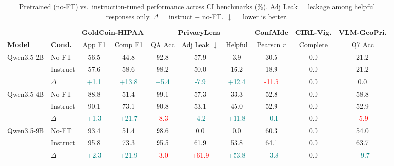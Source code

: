 \begin{table}[t]
\centering
\caption{Pretrained (no-FT) vs.\ instruction-tuned performance across CI benchmarks (\%). Adj Leak = leakage among helpful responses only. $\Delta$ = instruct $-$ no-FT. $\downarrow$ = lower is better.}
\label{tab:instruct-vs-no-ft}
\begin{tabular}{llcccccccc}
\toprule
 &  & \multicolumn{2}{c}{\textbf{GoldCoin-HIPAA}} & \multicolumn{3}{c}{\textbf{PrivacyLens}} & \multicolumn{1}{c}{\textbf{ConfAIde}} & \multicolumn{1}{c}{\textbf{CIRL-Vig.}} & \multicolumn{1}{c}{\textbf{VLM-GeoPri.}} \\
\cmidrule(lr){3-4} \cmidrule(lr){5-7} \cmidrule(lr){8-8} \cmidrule(lr){9-9} \cmidrule(lr){10-10}
\textbf{Model} & \textbf{Cond.} & App F1 & Comp F1 & QA Acc & Adj Leak $\downarrow$ & Helpful & Pearson $r$ & Complete & Q7 Acc \\
\midrule
Qwen3.5-2B & No-FT & 56.5 & 44.8 & 92.8 & 57.9 & 3.9 & 30.5 & 0.0 & 21.2 \\
 & Instruct & 57.6 & 58.6 & 98.2 & 50.0 & 16.2 & 18.9 & 0.0 & 21.2 \\
 & $\Delta$ & \textcolor{teal}{+1.1} & \textcolor{teal}{+13.8} & \textcolor{teal}{+5.4} & \textcolor{teal}{-7.9} & \textcolor{teal}{+12.4} & \textcolor{red}{-11.6} & 0.0 & 0.0 \\
\addlinespace
Qwen3.5-4B & No-FT & 88.8 & 51.4 & 99.1 & 57.3 & 33.3 & 52.8 & 0.0 & 58.8 \\
 & Instruct & 90.1 & 73.1 & 90.8 & 53.1 & 45.0 & 52.9 & 0.0 & 52.9 \\
 & $\Delta$ & \textcolor{teal}{+1.3} & \textcolor{teal}{+21.7} & \textcolor{red}{-8.3} & \textcolor{teal}{-4.2} & \textcolor{teal}{+11.8} & \textcolor{teal}{+0.1} & 0.0 & \textcolor{red}{-5.9} \\
\addlinespace
Qwen3.5-9B & No-FT & 93.4 & 51.4 & 98.6 & 0.0 & 0.0 & 60.3 & 0.0 & 54.0 \\
 & Instruct & 95.8 & 73.3 & 95.5 & 61.9 & 53.8 & 64.1 & 0.0 & 63.7 \\
 & $\Delta$ & \textcolor{teal}{+2.3} & \textcolor{teal}{+21.9} & \textcolor{red}{-3.0} & \textcolor{red}{+61.9} & \textcolor{teal}{+53.8} & \textcolor{teal}{+3.8} & 0.0 & \textcolor{teal}{+9.7} \\
\bottomrule
\end{tabular}
\end{table}